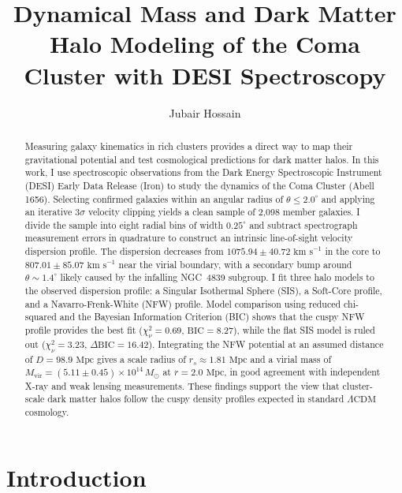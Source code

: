 \documentclass[twocolumn]{aastex631}
\begin{document}
\title{Dynamical Mass and Dark Matter Halo Modeling of the Coma Cluster with DESI Spectroscopy}


\author{Jubair Hossain}

\begin{abstract}
Measuring galaxy kinematics in rich clusters provides a direct way to map their gravitational potential and test cosmological predictions for dark matter halos. In this work, I use spectroscopic observations from the Dark Energy Spectroscopic Instrument (DESI) Early Data Release (Iron) to study the dynamics of the Coma Cluster (Abell 1656). Selecting confirmed galaxies within an angular radius of $\theta \le 2.0^\circ$ and applying an iterative $3\sigma$ velocity clipping yields a clean sample of 2,098 member galaxies. I divide the sample into eight radial bins of width $0.25^\circ$ and subtract spectrograph measurement errors in quadrature to construct an intrinsic line-of-sight velocity dispersion profile. The dispersion decreases from $1075.94 \pm 40.72\text{ km s}^{-1}$ in the core to $807.01 \pm 85.07\text{ km s}^{-1}$ near the virial boundary, with a secondary bump around $\theta \sim 1.4^\circ$ likely caused by the infalling NGC~4839 subgroup. I fit three halo models to the observed dispersion profile: a Singular Isothermal Sphere (SIS), a Soft-Core profile, and a Navarro-Frenk-White (NFW) profile. Model comparison using reduced chi-squared and the Bayesian Information Criterion (BIC) shows that the cuspy NFW profile provides the best fit ($\chi_\nu^2 = 0.69$, $\text{BIC} = 8.27$), while the flat SIS model is ruled out ($\chi_\nu^2 = 3.23$, $\Delta\text{BIC} = 16.42$). Integrating the NFW potential at an assumed distance of $D = 98.9\text{ Mpc}$ gives a scale radius of $r_s \approx 1.81\text{ Mpc}$ and a virial mass of $M_{\text{vir}} = (5.11 \pm 0.45) \times 10^{14}\,M_\odot$ at $r = 2.0\text{ Mpc}$, in good agreement with independent X-ray and weak lensing measurements. These findings support the view that cluster-scale dark matter halos follow the cuspy density profiles expected in standard $\Lambda\text{CDM}$ cosmology.
\end{abstract}


\section{Introduction} \label{sec:intro}
\end{document}
